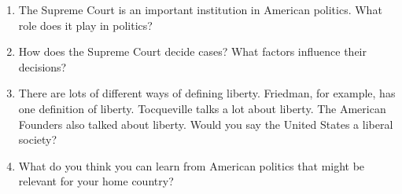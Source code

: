 \documentclass[12pt,a4paper]{article}
\begin{document}
\begin{enumerate}
\item The Supreme Court is an important institution in American politics. What role does it play in politics?
\item How does the Supreme Court decide cases? What factors influence their decisions?
\item There are lots of different ways of defining liberty. Friedman, for example, has one definition of liberty. Tocqueville talks a lot about liberty. The American Founders also talked about liberty. Would you say the United States a liberal society?
\item What do you think you can learn from American politics that might be relevant for your home country?
\end{enumerate}
\end{document}
